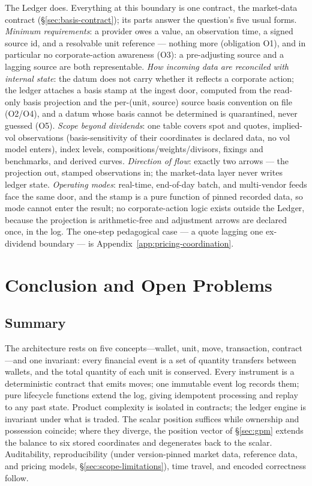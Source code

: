 \documentclass[11pt,a4paper]{article}
\begin{document}
The Ledger does. Everything at this boundary is one contract, the market-data
contract (\S\ref{sec:basis-contract}); its parts answer the question's five usual
forms. \emph{Minimum requirements}: a provider owes a value, an observation time, a
signed source id, and a resolvable unit reference --- nothing more (obligation O1),
and in particular no corporate-action awareness (O3): a pre-adjusting source and a
lagging source are both representable. \emph{How incoming data are reconciled with
internal state}: the datum does not carry whether it reflects a corporate action;
the ledger attaches a basis stamp at the ingest door, computed from the read-only
basis projection and the per-(unit, source) source basis convention on file
(O2/O4), and a datum whose basis cannot be determined is quarantined, never guessed
(O5). \emph{Scope beyond dividends}: one table covers spot and quotes, implied-vol
observations (basis-sensitivity of their coordinates is declared data, no vol model
enters), index levels, compositions/weights/divisors, fixings and benchmarks, and
derived curves. \emph{Direction of flow}: exactly two arrows --- the projection out,
stamped observations in; the market-data layer never writes ledger state.
\emph{Operating modes}: real-time, end-of-day batch, and multi-vendor feeds face
the same door, and the stamp is a pure function of pinned recorded data, so mode
cannot enter the result; no corporate-action logic exists outside the Ledger,
because the projection is arithmetic-free and adjustment arrows are declared once,
in the log. The one-step pedagogical case --- a quote lagging one ex-dividend
boundary --- is Appendix~\ref{app:pricing-coordination}.

\clearpage

\section{Conclusion and Open Problems}
\label{sec:conclusion}

\subsection{Summary}

The architecture rests on five concepts---wallet, unit, move, transaction, contract---and one invariant: every financial event is a set of quantity transfers between wallets, and the total quantity of each unit is conserved. Every instrument is a deterministic contract that emits moves; one immutable event log records them; pure lifecycle functions extend the log, giving idempotent processing and replay to any past state. Product complexity is isolated in contracts; the ledger engine is invariant under what is traded. The scalar position suffices while ownership and possession coincide; where they diverge, the position vector of \S\ref{sec:gpm} extends the balance to six stored coordinates and degenerates back to the scalar. Auditability, reproducibility (under version-pinned market data, reference data, and pricing models, \S\ref{sec:scope-limitations}), time travel, and encoded correctness follow.
\end{document}
